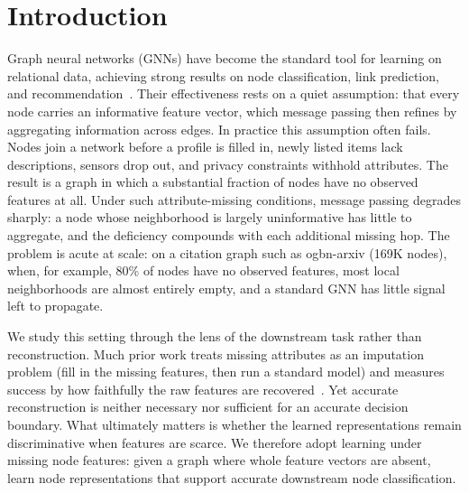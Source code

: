 \section{Introduction}
\label{sec:intro}

Graph neural networks (GNNs) have become the standard tool for learning on relational data, achieving strong results on node classification, link prediction, and recommendation~\cite{hamilton2017inductive, velivckovic2017graph}. Their effectiveness rests on a quiet assumption: that every node carries an informative feature vector, which message passing then refines by aggregating information across edges. In practice this assumption often fails. Nodes join a network before a profile is filled in, newly listed items lack descriptions, sensors drop out, and privacy constraints withhold attributes. The result is a graph in which a substantial fraction of nodes have no observed features at all. Under such attribute-missing conditions, message passing degrades sharply: a node whose neighborhood is largely uninformative has little to aggregate, and the deficiency compounds with each additional missing hop. The problem is acute at scale: on a citation graph such as ogbn-arxiv (169K nodes), when, for example, 80\% of nodes have no observed features, most local neighborhoods are almost entirely empty, and a standard GNN has little signal left to propagate.

We study this setting through the lens of the downstream task rather than reconstruction. Much prior work treats missing attributes as an imputation problem (fill in the missing features, then run a standard model) and measures success by how faithfully the raw features are recovered~\cite{chen2020learning, yoo2022accurate}. Yet accurate reconstruction is neither necessary nor sufficient for an accurate decision boundary. What ultimately matters is whether the learned representations remain discriminative when features are scarce. We therefore adopt learning under missing node features: given a graph where whole feature vectors are absent, learn node representations that support accurate downstream node classification.

